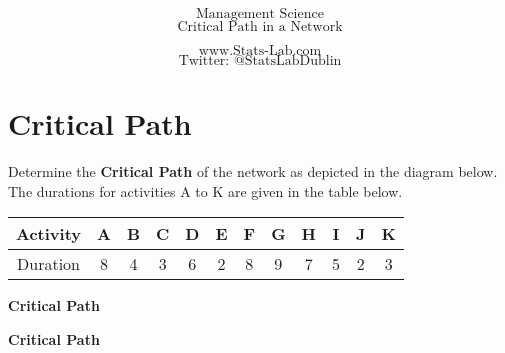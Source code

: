 \documentclass[]{article}
\title{}
\author{}
\begin{document}
\Huge
\[ \mbox{Management Science} \]
\Huge
\[ \mbox{Critical Path in a Network} \]

\LARGE
\[ \mbox{www.Stats-Lab.com} \]
\[ \mbox{Twitter: @StatsLabDublin} \]
\newpage
\Large
\section*{Critical Path}

Determine the \textbf{Critical Path} of the network as depicted in the diagram below.
The durations for activities A to K are given in the table below.
\begin{center}
\begin{tabular}{|c|c|c|c|c|c|c|c|c|c|c|c|}
\hline Activity & A & B & C & D & E & F & G & H & I & J & K \\ 
\hline Duration & 8 & 4 & 3 & 6 & 2 & 8 & 9 & 7 & 5 & 2 & 3 \\ 
\hline 
\end{tabular}
\end{center} 
\newpage
\textbf{Critical Path}

\newpage
\textbf{Critical Path}
\end{document}
